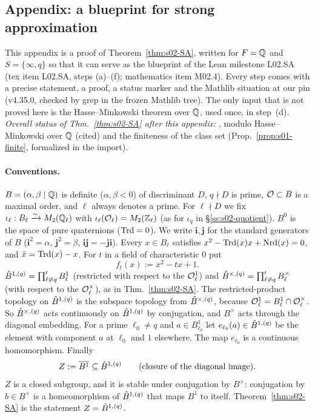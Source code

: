 \subsection{Appendix: a blueprint for strong approximation}\label{ss:s02-sa}

This appendix is a proof of Theorem~\ref{thm:s02-SA}, written for $F=\mathbb{Q}$ and $S=\{\infty,q\}$ so that it can serve as the
blueprint of the Lean milestone L02.SA (tex item L02.SA, steps (a)--(f); mathematics item M02.4). Every step comes with a precise
statement, a proof, a status marker and the Mathlib situation at our pin (v4.35.0, checked by grep in the frozen Mathlib tree).
The only input that is not proved here is the Hasse--Minkowski theorem over $\mathbb{Q}$, used once, in step~(d).
\emph{Overall status of Thm.~\ref{thm:s02-SA} after this appendix:} \stpmc{}, modulo Hasse--Minkowski over $\mathbb{Q}$ (cited) and the
finiteness of the class set (Prop.~\ref{prop:s01-finite}, formalized in the import).

\paragraph{Conventions.} $B=(\alpha,\beta\mid\mathbb{Q})$ is definite ($\alpha,\beta<0$) of discriminant $D$, $q\nmid D$ is prime,
$\mathcal{O}\subset B$ is a maximal order, and $\ell$ always denotes a prime. For $\ell\nmid D$ we fix
$\iota_\ell:B_\ell\xrightarrow{\sim}M_2(\mathbb{Q}_\ell)$ with $\iota_\ell(\mathcal{O}_\ell)=M_2(\mathbb{Z}_\ell)$ (as for $\iota_q$ in
\S\ref{ss:s02-quotient}). $B^0$ is the space of pure quaternions ($\mathrm{Trd}=0$). We write $\mathbf i,\mathbf j$ for the standard
generators of $B$ ($\mathbf i^2=\alpha$, $\mathbf j^2=\beta$, $\mathbf{ij}=-\mathbf{ji}$). Every $x\in B_\ell$ satisfies
$x^2-\mathrm{Trd}(x)x+\mathrm{Nrd}(x)=0$, and $\bar x=\mathrm{Trd}(x)-x$. For $t$ in a field of characteristic $0$ put
\[f_t(x):=x^2-tx+1 .\]
$\hat{B}^{1,(q)}=\prod'_{\ell\ne q}B^1_\ell$ (restricted with respect to the $\mathcal{O}^1_\ell$) and
$\hat{B}^{\times,(q)}=\prod'_{\ell\ne q}B^\times_\ell$ (with respect to the $\mathcal{O}^\times_\ell$), as in Thm.~\ref{thm:s02-SA}. The
restricted-product topology on $\hat{B}^{1,(q)}$ is the subspace topology from $\hat{B}^{\times,(q)}$, because
$\mathcal{O}^1_\ell=B^1_\ell\cap\mathcal{O}_\ell^\times$. So $\hat{B}^{\times,(q)}$ acts continuously on $\hat{B}^{1,(q)}$ by conjugation, and $B^\times$
acts through the diagonal embedding. For a prime $\ell_0\ne q$ and $a\in B^1_{\ell_0}$ let $e_{\ell_0}(a)\in\hat{B}^{1,(q)}$ be the
element with component $a$ at $\ell_0$ and $1$ elsewhere. The map $e_{\ell_0}$ is a continuous homomorphism. Finally
\[Z:=\overline{B^1}\subseteq\hat{B}^{1,(q)}\qquad\text{(closure of the diagonal image).}\]
$Z$ is a closed subgroup, and it is stable under conjugation by $B^\times$: conjugation by $b\in B^\times$ is a homeomorphism of
$\hat{B}^{1,(q)}$ that maps $B^1$ to itself. Theorem~\ref{thm:s02-SA} is the statement $Z=\hat{B}^{1,(q)}$.

